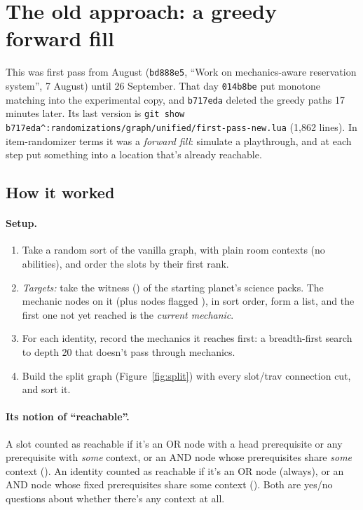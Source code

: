 \section{The old approach: a greedy forward fill}
\label{sec:greedy}

This was first pass from August (\texttt{bd888e5}, ``Work on mechanics-aware reservation system'', 7 August) until 26 September. That day \texttt{014b8be} put monotone matching into the experimental copy, and \texttt{b717eda} deleted the greedy paths 17 minutes later. Its last version is \verb|git show b717eda^:randomizations/graph/unified/first-pass-new.lua| (1{,}862 lines). In item-randomizer terms it was a \emph{forward fill}: simulate a playthrough, and at each step put something into a location that's already reachable.

\subsection{How it worked}

\paragraph{Setup.}
\begin{enumerate}
  \item Take a random sort of the vanilla graph, with plain room contexts (no abilities), and order the slots by their first rank.
  \item \emph{Targets:} take the witness () of the starting planet's science packs. The mechanic nodes on it (plus nodes flagged ), in sort order, form a list, and the first one not yet reached is the \emph{current mechanic}.
  \item For each identity, record the mechanics it reaches first: a breadth-first search to depth 20 that doesn't pass through mechanics.
  \item Build the split graph (Figure~\ref{fig:split}) with every slot/trav connection cut, and sort it.
\end{enumerate}

\paragraph{Its notion of ``reachable''.} A slot counted as reachable if it's an OR node with a head prerequisite or any prerequisite with \emph{some} context, or an AND node whose prerequisites share \emph{some} context (). An identity counted as reachable if it's an OR node (always), or an AND node whose fixed prerequisites share some context (). Both are yes/no questions about whether there's any context at all.

